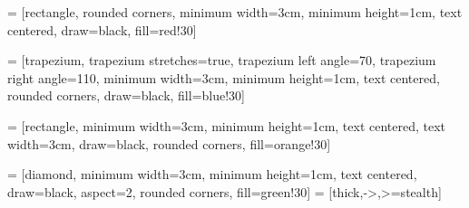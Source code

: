 
 = [rectangle, rounded corners, 
minimum width=3cm, 
minimum height=1cm,
text centered, 
draw=black, 
fill=red!30]

 = [trapezium, 
trapezium stretches=true, %
trapezium left angle=70, 
trapezium right angle=110, 
minimum width=3cm, 
minimum height=1cm, text centered, 
rounded corners,
draw=black, fill=blue!30]

 = [rectangle, 
minimum width=3cm, 
minimum height=1cm, 
text centered, 
text width=3cm, 
draw=black, 
rounded corners,
fill=orange!30]

 = [diamond, 
minimum width=3cm, 
minimum height=1cm, 
text centered, 
draw=black, 
aspect=2,
rounded corners,
fill=green!30]
 = [thick,->,>=stealth]


\usepackage{tikz}
\usetikzlibrary{shapes.geometric, arrows}

